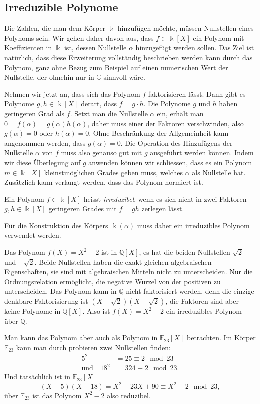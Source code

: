 \subsection{Irreduzible Polynome
\label{buch:subsection:irreduziblepolynome}}
Die Zahlen, die man dem Körper $\Bbbk$ hinzufügen möchte, müssen Nullstellen
eines Polynoms sein.
Wir gehen daher davon aus, dass $f\in \Bbbk[X]$ ein Polynom mit
Koeffizienten in $\Bbbk$ ist, dessen Nullstelle $\alpha$ hinzugefügt
werden sollen.
Das Ziel ist natürlich, dass diese Erweiterung vollständig beschrieben
werden kann durch das Polynom, ganz ohne Bezug zum Beispiel auf einen
numerischen Wert der Nullstelle, der ohnehin nur in $\mathbb{C}$ sinnvoll
wäre.

Nehmen wir jetzt an, dass sich das Polynom $f$ faktorisieren lässt.
Dann gibt es Polynome $g,h\in\Bbbk[X]$ derart, dass $f=g\cdot h$.
Die Polynome $g$ und $h$ haben geringeren Grad als $f$. 
Setzt man die Nullstelle $\alpha$ ein, erhält man
$0=f(\alpha)=g(\alpha)h(\alpha)$, daher muss einer der Faktoren
verschwinden, also $g(\alpha)=0$ oder $h(\alpha)=0$.
Ohne Beschränkung der Allgemeinheit kann angenommen werden, dass
$g(\alpha)=0$.
Die Operation des Hinzufügens der Nullstelle $\alpha$ von $f$
muss also genauso gut mit $g$ ausgeführt werden können.
Indem wir diese Überlegung auf $g$ anwenden können wir schliessen,
dass es ein Polynom $m\in\Bbbk[X]$ kleinstmöglichen Grades geben muss,
welches $\alpha$ als Nullstelle hat.
Zusätzlich kann verlangt werden, dass das Polynom normiert ist.

\begin{definition}
Ein Polynom $f\in \Bbbk[X]$ heisst {\em irreduzibel}, wenn es sich nicht
in zwei Faktoren $g,h\in \Bbbk[X]$ geringeren Grades mit $f=gh$ zerlegen
lässt.
%
\end{definition}

Für die Konstruktion des Körpers $\Bbbk(\alpha)$ muss daher ein irreduzibles
Polynom verwendet werden.

\begin{beispiel}
Das Polynom $f(X)=X^2-2$ ist in $\mathbb{Q}[X]$, es hat die beiden
Nullstellen $\sqrt{2}$ und $-\sqrt{2}$.
Beide Nullstellen haben die exakt gleichen algebraischen Eigenschaften,
sie sind mit algebraischen Mitteln nicht zu unterscheiden.
Nur die Ordnungsrelation ermöglicht, die negative Wurzel von der
positiven zu unterscheiden.
Das Polynom kann in $\mathbb{Q}$ nicht faktorisiert werden, denn die
einzige denkbare Faktorisierung ist $(X-\sqrt{2})(X+\sqrt{2})$, die
Faktoren sind aber keine Polynome in $\mathbb{Q}[X]$.
Also ist $f(X) = X^2 - 2$ ein irreduzibles Polynom über $\mathbb Q$.

Man kann das Polynom aber auch als Polynom in $\mathbb{F}_{23}[X]$
betrachten.
Im Körper $\mathbb{F}_{23}$ kann man durch probieren zwei Nullstellen
finden:
\begin{align*}
5^2 &= 25\equiv 2\mod 23
\\
\text{und}\quad
18^2 &=324 \equiv 2 \mod 23.
\end{align*}
Und tatsächlich ist in $\mathbb{F}_{23}[X]$
\[
(X-5)(X-18) = X^2 -23X+90
\equiv
X^2 -2 \mod 23,
\]
über $\mathbb{F}_{23}$ ist das Polynom $X^2-2$ also reduzibel.
\end{beispiel}

